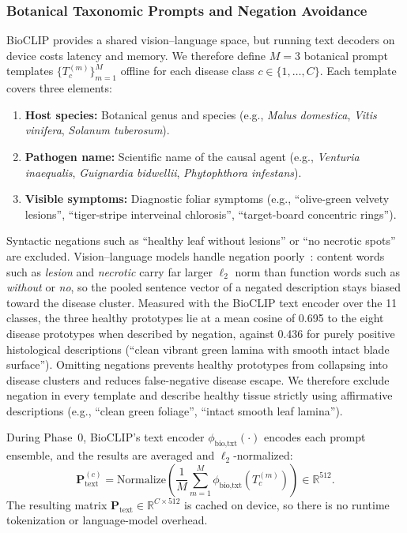 \documentclass[preprint,12pt]{elsarticle}
\begin{document}
\subsubsection{Botanical Taxonomic Prompts and Negation Avoidance}
BioCLIP provides a shared vision--language space, but running text decoders on device costs latency and memory. We therefore define $M = 3$ botanical prompt templates $\{T_c^{(m)}\}_{m=1}^M$ offline for each disease class $c \in \{1, \dots, C\}$. Each template covers three elements:
\begin{enumerate}
    \item \textbf{Host species:} Botanical genus and species (e.g., \textit{Malus domestica}, \textit{Vitis vinifera}, \textit{Solanum tuberosum}).
    \item \textbf{Pathogen name:} Scientific name of the causal agent (e.g., \textit{Venturia inaequalis}, \textit{Guignardia bidwellii}, \textit{Phytophthora infestans}).
    \item \textbf{Visible symptoms:} Diagnostic foliar symptoms (e.g., ``olive-green velvety lesions'', ``tiger-stripe interveinal chlorosis'', ``target-board concentric rings'').
\end{enumerate}
Syntactic negations such as ``healthy leaf without lesions'' or ``no necrotic spots'' are excluded. Vision--language models handle negation poorly~\cite{radford2021clip, yuksekgonul2023when, alhamoud2025vision}: content words such as \textit{lesion} and \textit{necrotic} carry far larger $\ell_2$ norm than function words such as \textit{without} or \textit{no}, so the pooled sentence vector of a negated description stays biased toward the disease cluster. Measured with the BioCLIP text encoder over the 11 classes, the three healthy prototypes lie at a mean cosine of 0.695 to the eight disease prototypes when described by negation, against 0.436 for purely positive histological descriptions (``clean vibrant green lamina with smooth intact blade surface''). Omitting negations prevents healthy prototypes from collapsing into disease clusters and reduces false-negative disease escape. We therefore exclude negation in every template and describe healthy tissue strictly using affirmative descriptions (e.g., ``clean green foliage'', ``intact smooth leaf lamina'').

During Phase~0, BioCLIP's text encoder $\phi_{\text{bio,txt}}(\cdot)$ encodes each prompt ensemble, and the results are averaged and $\ell_2$-normalized:
\begin{equation}
    \mathbf{P}_{\text{text}}^{(c)} = \text{Normalize}\left(\frac{1}{M}\sum_{m=1}^M \phi_{\text{bio,txt}}(T_c^{(m)})\right) \in \mathbb{R}^{512}.
\end{equation}
The resulting matrix $\mathbf{P}_{\text{text}} \in \mathbb{R}^{C \times 512}$ is cached on device, so there is no runtime tokenization or language-model overhead.
\end{document}

